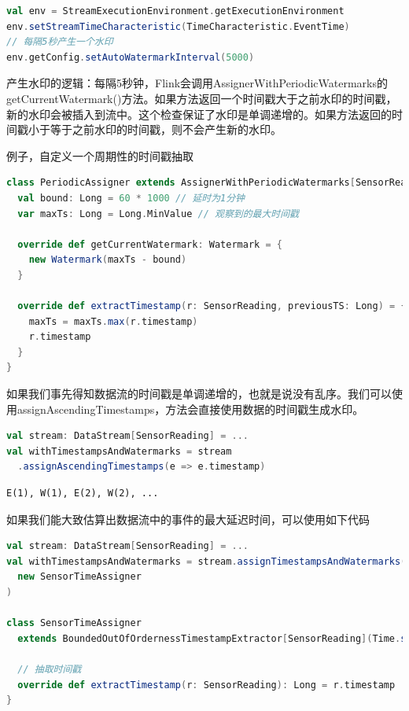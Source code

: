\documentclass[oneside]{ctexbook}
\begin{document}
\begin{lstlisting}[language=scala]
val env = StreamExecutionEnvironment.getExecutionEnvironment
env.setStreamTimeCharacteristic(TimeCharacteristic.EventTime)
// 每隔5秒产生一个水印
env.getConfig.setAutoWatermarkInterval(5000)
\end{lstlisting}

产生水印的逻辑：每隔5秒钟，Flink会调用AssignerWithPeriodicWatermarks的getCurrentWatermark()方法。如果方法返回一个时间戳大于之前水印的时间戳，新的水印会被插入到流中。这个检查保证了水印是单调递增的。如果方法返回的时间戳小于等于之前水印的时间戳，则不会产生新的水印。

例子，自定义一个周期性的时间戳抽取

\begin{lstlisting}[language=scala]
class PeriodicAssigner extends AssignerWithPeriodicWatermarks[SensorReading] {
  val bound: Long = 60 * 1000 // 延时为1分钟
  var maxTs: Long = Long.MinValue // 观察到的最大时间戳

  override def getCurrentWatermark: Watermark = {
    new Watermark(maxTs - bound)
  }

  override def extractTimestamp(r: SensorReading, previousTS: Long) = {
    maxTs = maxTs.max(r.timestamp)
    r.timestamp
  }
}
\end{lstlisting}

如果我们事先得知数据流的时间戳是单调递增的，也就是说没有乱序。我们可以使用assignAscendingTimestamps，方法会直接使用数据的时间戳生成水印。

\begin{lstlisting}[language=scala]
val stream: DataStream[SensorReading] = ...
val withTimestampsAndWatermarks = stream
  .assignAscendingTimestamps(e => e.timestamp)
\end{lstlisting}

\begin{lstlisting}
E(1), W(1), E(2), W(2), ...
\end{lstlisting}

如果我们能大致估算出数据流中的事件的最大延迟时间，可以使用如下代码

\begin{lstlisting}[language=scala]
val stream: DataStream[SensorReading] = ...
val withTimestampsAndWatermarks = stream.assignTimestampsAndWatermarks(
  new SensorTimeAssigner 
)

class SensorTimeAssigner
  extends BoundedOutOfOrdernessTimestampExtractor[SensorReading](Time.seconds(5)) {

  // 抽取时间戳
  override def extractTimestamp(r: SensorReading): Long = r.timestamp
}
\end{lstlisting}
\end{document}
